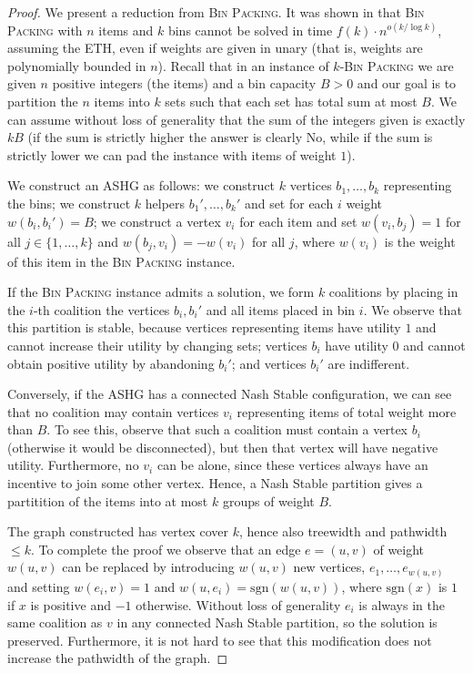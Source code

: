 \documentclass[letterpaper,USenglish,cleveref, autoref, thm-restate]{lipics-v2021}
\begin{document}
\begin{proof}

We present a reduction from \textsc{Bin Packing}.  It was shown in
\cite{JansenKMS13} that \textsc{Bin Packing} with $n$ items and $k$ bins cannot
be solved in time $f(k)\cdot n^{o(k/\log k)}$, assuming the ETH, even if
weights are given in unary (that is, weights are polynomially bounded in $n$).
Recall that in an instance of $k$-\textsc{Bin Packing} we are given $n$
positive integers (the items) and a bin capacity $B>0$ and our goal is to
partition the $n$ items into $k$ sets such that each set has total sum at most
$B$. We can assume without loss of generality that the sum of the integers
given is exactly $kB$ (if the sum is strictly higher the answer is clearly No,
while if the sum is strictly lower we can pad the instance with items of weight
$1$). 

We construct an ASHG as follows: we construct $k$ vertices $b_1,\ldots,b_k$
representing the bins; we construct $k$ helpers $b_1',\ldots, b_k'$ and set for
each $i$ weight $w(b_i,b_i')=B$; we construct a vertex $v_i$ for each item and
set $w(v_i,b_j) = 1$ for all $j\in\{1,\ldots,k\}$ and $w(b_j,v_i)= -w(v_i)$ for
all $j$, where $w(v_i)$ is the weight of this item in the \textsc{Bin Packing}
instance.

If the \textsc{Bin Packing} instance admits a solution, we form $k$ coalitions
by placing in the $i$-th coalition the vertices $b_i,b_i'$ and all items placed
in bin $i$. We observe that this partition is stable, because vertices
representing items have utility $1$ and cannot increase their utility by
changing sets; vertices $b_i$ have utility $0$ and cannot obtain positive
utility by abandoning $b_i'$; and vertices $b_i'$ are indifferent. 

Conversely, if the ASHG has a connected Nash Stable configuration, we can see
that no coalition may contain vertices $v_i$ representing items of total weight
more than $B$. To see this, observe that such a coalition must contain a vertex
$b_i$ (otherwise it would be disconnected), but then that vertex will have
negative utility. Furthermore, no $v_i$ can be alone, since these vertices
always have an incentive to join some other vertex.  Hence, a Nash Stable
partition gives a partitition of the items into at most $k$ groups of weight
$B$.

The graph constructed has vertex cover $k$, hence also treewidth and pathwidth
$\le k$.  To complete the proof we observe that an edge $e=(u,v)$ of weight
$w(u,v)$ can be replaced by introducing $w(u,v)$ new vertices,
$e_1,\ldots,e_{w(u,v)}$ and setting $w(e_i,v)=1$ and
$w(u,e_i)=\textrm{sgn}(w(u,v))$, where $\textrm{sgn}(x)$ is $1$ if $x$ is
positive and $-1$ otherwise. Without loss of generality $e_i$ is always in the
same coalition as $v$ in any connected Nash Stable partition, so the solution
is preserved. Furthermore, it is not hard to see that this modification does
not increase the pathwidth of the graph. \end{proof}
\end{document}

